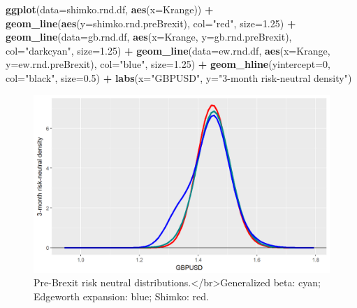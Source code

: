 \documentclass[]{book}
\newenvironment{Shaded}{\begin{snugshade}}{\end{snugshade}}
\newcommand{\KeywordTok}[1]{\textcolor[rgb]{0.13,0.29,0.53}{\textbf{#1}}}
\newcommand{\DataTypeTok}[1]{\textcolor[rgb]{0.13,0.29,0.53}{#1}}
\newcommand{\DecValTok}[1]{\textcolor[rgb]{0.00,0.00,0.81}{#1}}
\newcommand{\FloatTok}[1]{\textcolor[rgb]{0.00,0.00,0.81}{#1}}
\newcommand{\StringTok}[1]{\textcolor[rgb]{0.31,0.60,0.02}{#1}}
\newcommand{\OperatorTok}[1]{\textcolor[rgb]{0.81,0.36,0.00}{\textbf{#1}}}
\newcommand{\NormalTok}[1]{#1}
\theoremstyle{definition}
\theoremstyle{definition}
\theoremstyle{definition}
\theoremstyle{remark}
\begin{document}
\begin{Shaded}
\begin{Highlighting}[]
\KeywordTok{ggplot}\NormalTok{(}\DataTypeTok{data=}\NormalTok{shimko.rnd.df, }\KeywordTok{aes}\NormalTok{(}\DataTypeTok{x=}\NormalTok{Krange)) }\OperatorTok{+}\StringTok{ }
\StringTok{  }\KeywordTok{geom_line}\NormalTok{(}\KeywordTok{aes}\NormalTok{(}\DataTypeTok{y=}\NormalTok{shimko.rnd.preBrexit), }\DataTypeTok{col=}\StringTok{"red"}\NormalTok{, }\DataTypeTok{size=}\FloatTok{1.25}\NormalTok{) }\OperatorTok{+}
\StringTok{  }\KeywordTok{geom_line}\NormalTok{(}\DataTypeTok{data=}\NormalTok{gb.rnd.df, }\KeywordTok{aes}\NormalTok{(}\DataTypeTok{x=}\NormalTok{Krange, }\DataTypeTok{y=}\NormalTok{gb.rnd.preBrexit), }\DataTypeTok{col=}\StringTok{"darkcyan"}\NormalTok{, }\DataTypeTok{size=}\FloatTok{1.25}\NormalTok{) }\OperatorTok{+}
\StringTok{  }\KeywordTok{geom_line}\NormalTok{(}\DataTypeTok{data=}\NormalTok{ew.rnd.df, }\KeywordTok{aes}\NormalTok{(}\DataTypeTok{x=}\NormalTok{Krange, }\DataTypeTok{y=}\NormalTok{ew.rnd.preBrexit), }\DataTypeTok{col=}\StringTok{"blue"}\NormalTok{, }\DataTypeTok{size=}\FloatTok{1.25}\NormalTok{) }\OperatorTok{+}
\StringTok{  }\KeywordTok{geom_hline}\NormalTok{(}\DataTypeTok{yintercept=}\DecValTok{0}\NormalTok{, }\DataTypeTok{col=}\StringTok{"black"}\NormalTok{, }\DataTypeTok{size=}\FloatTok{0.5}\NormalTok{) }\OperatorTok{+}
\StringTok{  }\KeywordTok{labs}\NormalTok{(}\DataTypeTok{x=}\StringTok{"GBPUSD"}\NormalTok{, }\DataTypeTok{y=}\StringTok{"3-month risk-neutral density"}\NormalTok{)   }
\end{Highlighting}
\end{Shaded}

\begin{figure}
\includegraphics[width=1\linewidth]{images/unnamed-chunk-66-1} \caption{Pre-Brexit risk neutral distributions.</br>Generalized beta: cyan; Edgeworth expansion: blue; Shimko: red.}\label{fig:unnamed-chunk-66}
\end{figure}
\end{document}
